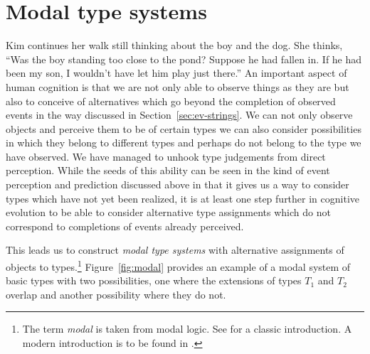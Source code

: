 
\section{Modal type systems}
\label{sec:percint-modal}

Kim continues her walk still thinking about the boy and the dog.  She
thinks,  ``Was
the boy standing too close to the pond?  Suppose he had fallen in.  If
he had been my son, I wouldn't have let him play just there.'' An
important aspect of human cognition is that we are not only able to
observe things as they are but also to conceive of alternatives which
go beyond the completion of observed events in the way discussed in
Section~\ref{sec:ev-strings}. We can not only observe objects and
perceive them to be of certain types we can also consider
possibilities in which they belong to different types and perhaps do
not belong to the type we have observed.  We have managed to unhook
type judgements from direct perception.  While the seeds of this
ability can be seen in the kind of event perception and prediction
discussed above in that it gives us a way to consider types which have
not yet been realized, it is at least one step further in cognitive
evolution to be able to consider alternative type assignments which do
not correspond to completions of events already perceived.



This leads us to construct \textit{modal type
systems} with alternative assignments of objects to
types.\footnote{The term \textit{modal} is taken from modal logic. See
  \cite{HughesCresswel1968} for a classic introduction. A modern
  introduction is to be found in \cite{BlackburnRijkeVenema2001}.}
Figure~\ref{fig:modal} provides an example of a modal system of basic
types with two
possibilities, one where the extensions of types $T_1$ and $T_2$
overlap and another possibility where they do not.  


